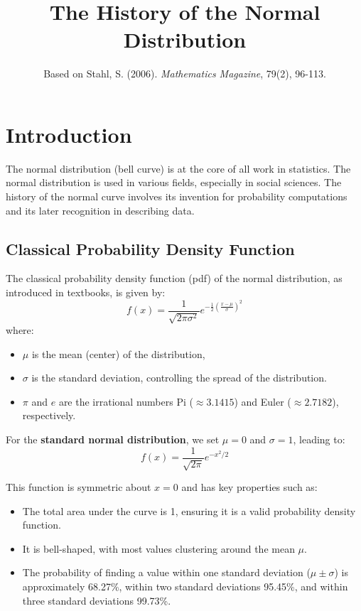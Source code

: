 \documentclass{article}
\title{The History of the Normal Distribution}
\author{Based on Stahl, S. (2006). \emph{Mathematics Magazine}, 79(2), 96-113.}
\date{}
\begin{document}
\maketitle

\section{Introduction}
The normal distribution (bell curve) is at the core of all work in statistics. The normal distribution is used in various fields, especially in social sciences. The history of the normal curve involves its invention for probability computations and its later recognition in describing data.

\subsection{Classical Probability Density Function}
The classical probability density function (pdf) of the normal distribution, as introduced in textbooks, is given by:
\begin{equation}
    f(x) = \frac{1}{\sqrt{2\pi \sigma^2}} e^{-\frac{1}{2} \left(\frac{x - \mu}{\sigma}\right)^2 }
\end{equation}
where:
\begin{itemize}
    \item $\mu$ is the mean (center) of the distribution,
    \item $\sigma$ is the standard deviation, controlling the spread of the distribution.
    \item $\pi$ and $e$ are the irrational numbers Pi ($\approx  3.1415$) and Euler ($\approx  2.7182$), respectively.
\end{itemize}

For the \textbf{standard normal distribution}, we set $\mu = 0$ and $\sigma = 1$, leading to:
\begin{equation}
    f(x) = \frac{1}{\sqrt{2\pi}} e^{-x^2/2}
\end{equation}

This function is symmetric about $x=0$ and has key properties such as:
\begin{itemize}
    \item The total area under the curve is 1, ensuring it is a valid probability density function.
    \item It is bell-shaped, with most values clustering around the mean $\mu$.
    \item The probability of finding a value within one standard deviation ($\mu \pm \sigma$) is approximately 68.27\%, within two standard deviations 95.45\%, and within three standard deviations 99.73\%.
\end{itemize}
\end{document}
